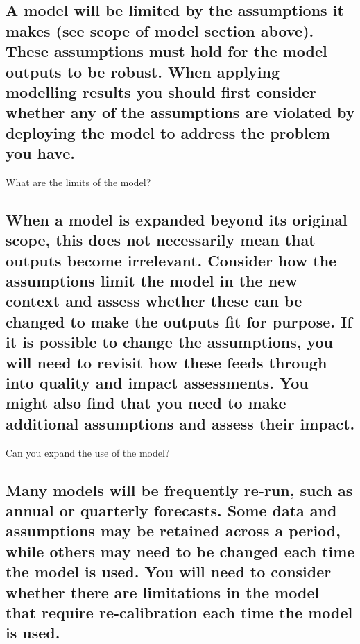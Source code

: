 \documentclass[]{book}
\begin{document}
\subsection{A model will be limited by the assumptions it makes (see
scope of model section above). These assumptions must hold for the model
outputs to be robust. When applying modelling results you should first
consider whether any of the assumptions are violated by deploying the
model to address the problem you
have.}\label{a-model-will-be-limited-by-the-assumptions-it-makes-see-scope-of-model-section-above.-these-assumptions-must-hold-for-the-model-outputs-to-be-robust.-when-applying-modelling-results-you-should-first-consider-whether-any-of-the-assumptions-are-violated-by-deploying-the-model-to-address-the-problem-you-have.}

 What are the limits of the model?

\subsection{When a model is expanded beyond its original scope, this
does not necessarily mean that outputs become irrelevant. Consider how
the assumptions limit the model in the new context and assess whether
these can be changed to make the outputs fit for purpose. If it is
possible to change the assumptions, you will need to revisit how these
feeds through into quality and impact assessments. You might also find
that you need to make additional assumptions and assess their
impact.}\label{when-a-model-is-expanded-beyond-its-original-scope-this-does-not-necessarily-mean-that-outputs-become-irrelevant.-consider-how-the-assumptions-limit-the-model-in-the-new-context-and-assess-whether-these-can-be-changed-to-make-the-outputs-fit-for-purpose.-if-it-is-possible-to-change-the-assumptions-you-will-need-to-revisit-how-these-feeds-through-into-quality-and-impact-assessments.-you-might-also-find-that-you-need-to-make-additional-assumptions-and-assess-their-impact.}

 Can you expand the use of the model?

\subsection{Many models will be frequently re-run, such as annual or
quarterly forecasts. Some data and assumptions may be retained across a
period, while others may need to be changed each time the model is used.
You will need to consider whether there are limitations in the model
that require re-calibration each time the model is
used.}\label{many-models-will-be-frequently-re-run-such-as-annual-or-quarterly-forecasts.-some-data-and-assumptions-may-be-retained-across-a-period-while-others-may-need-to-be-changed-each-time-the-model-is-used.-you-will-need-to-consider-whether-there-are-limitations-in-the-model-that-require-re-calibration-each-time-the-model-is-used.}
\end{document}
